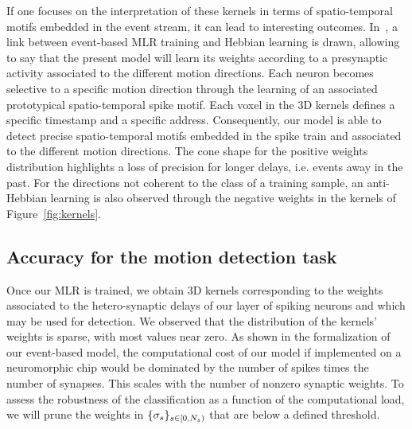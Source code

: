 \documentclass[default]{sn-jnl}%
\theoremstyle{thmstyleone}%
\theoremstyle{thmstyletwo}%
\theoremstyle{thmstylethree}%
\begin{document}
If one focuses on the interpretation of these kernels in terms of spatio-temporal motifs embedded in the event stream, it can lead to interesting outcomes. In~\citep{grimaldi_robust_2022}, a link between event-based MLR training and Hebbian learning is drawn, allowing to say that the present model will learn its weights according to a presynaptic activity associated to the different motion directions. Each neuron becomes selective to a specific motion direction through the learning of an associated prototypical spatio-temporal spike motif. Each voxel in the 3D kernels defines a specific timestamp and a specific address. Consequently, our model is able to detect precise spatio-temporal motifs embedded in the spike train and associated to the different motion directions. The cone shape for the positive weights distribution highlights a loss of precision for longer delays, i.e. events away in the past. For the directions not coherent to the class of a training sample, an anti-Hebbian learning is also observed through the negative weights in the kernels of Figure~\ref{fig:kernels}. 
%
\subsection{Accuracy for the motion detection task}

Once our MLR is trained, we obtain 3D kernels corresponding to the weights associated to the hetero-synaptic delays of our layer of spiking neurons and which may be used for detection. We observed that the distribution of the kernels' weights is sparse, with most values near zero. As shown in the formalization of our event-based model, the computational cost of our model if implemented on a neuromorphic chip would be dominated by the number of spikes times the number of synapses. This scales with the number of nonzero synaptic weights. To  assess the robustness of the classification as a function of the computational load, we will prune the weights in $\{\sigma_s\}_{s \in [0,N_{s})}$ that are below a defined threshold. 
\end{document}
